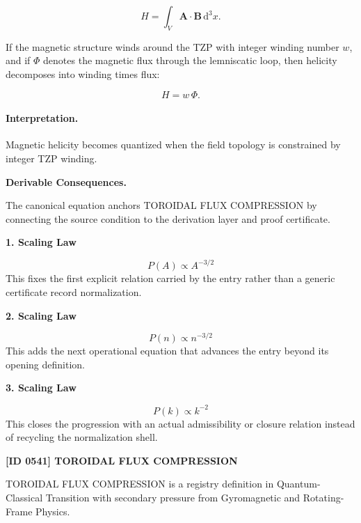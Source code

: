 \begin{equation}
H
=
\int_V
\mathbf{A}\cdot\mathbf{B}
\,\mathrm{d}^3x .
\end{equation}

If the magnetic structure winds around the TZP with integer winding number $w$, and if $\Phi$ denotes the magnetic flux through the lemniscatic loop, then helicity decomposes into winding times flux:

\begin{equation}
\boxed{
H=w\,\Phi .
}
\end{equation}

\paragraph{Interpretation.}
Magnetic helicity becomes quantized when the field topology is constrained by integer TZP winding.

\par\vspace{0.35em}
\noindent\textbf{Derivable Consequences.}\quad
\begingroup
\footnotesize
\raggedright
The canonical equation anchors TOROIDAL FLUX COMPRESSION by connecting the source condition to the derivation layer and proof certificate.
\par\endgroup

\noindent\textbf{1. Scaling Law}\par
\[
P(A) \propto A^{-3/2}
\]
\noindent This fixes the first explicit relation carried by the entry rather than a generic certificate record normalization.\par
\noindent\textbf{2. Scaling Law}\par
\[
P(n) \propto n^{-3/2}
\]
\noindent This adds the next operational equation that advances the entry beyond its opening definition.\par
\noindent\textbf{3. Scaling Law}\par
\[
P(k) \propto k^{-2}
\]
\noindent This closes the progression with an actual admissibility or closure relation instead of recycling the normalization shell.\par

\clearpage
\noindent\textbf{[ID 0541] TOROIDAL FLUX COMPRESSION}\par
\vspace{0.35em}
\begingroup\small
{}
TOROIDAL FLUX COMPRESSION is a registry definition in Quantum-Classical Transition with secondary pressure from Gyromagnetic and Rotating-Frame Physics.

